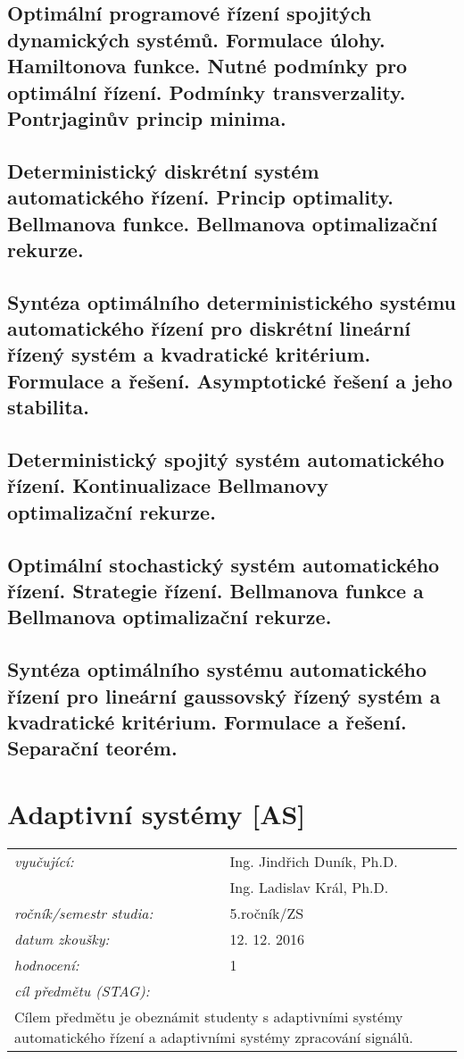 \subsection{Optimální programové řízení spojitých dynamických systémů. Formulace úlohy. Hamiltonova funkce. Nutné podmínky pro optimální řízení. Podmínky transverzality. Pontrjaginův princip minima.}

\subsection{Deterministický diskrétní systém automatického řízení. Princip optimality. Bellmanova funkce. Bellmanova optimalizační rekurze.}

\subsection{Syntéza optimálního deterministického systému automatického řízení pro diskrétní lineární řízený systém a kvadratické kritérium. Formulace a řešení. Asymptotické řešení a jeho stabilita.}

\subsection{Deterministický spojitý systém automatického řízení. Kontinualizace Bellmanovy optimalizační rekurze.}

\subsection{Optimální stochastický systém automatického řízení. Strategie řízení. Bellmanova funkce a Bellmanova optimalizační rekurze.}

\subsection{Syntéza optimálního systému automatického řízení pro lineární gaussovský řízený systém a kvadratické kritérium. Formulace a řešení. Separační teorém.}

\section{Adaptivní systémy [AS]}

\begin{table}[H]
\centering
\begin{tabular}{p{4cm} p{12cm}}
\textit{vyučující:}             & Ing. Jindřich Duník, Ph.D. \\
								 & Ing. Ladislav Král, Ph.D. \\
\textit{ročník/semestr studia:} & 5.ročník/ZS \\
\textit{datum zkoušky:}         & 12. 12. 2016 \\
\textit{hodnocení:}             & 1 \\
\textit{cíl předmětu (STAG):}   & \\
\multicolumn{2}{p{16cm}}{Cílem předmětu je obeznámit studenty s adaptivními systémy automatického řízení a adaptivními systémy zpracování signálů.}
\end{tabular}
\end{table}

